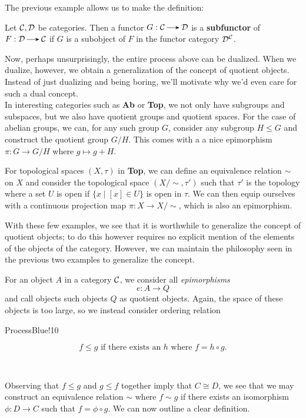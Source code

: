 The previous example allows us to make the definition:
\begin{definition}
    Let $\mathcal{C}, \mathcal{D}$ be categories. Then a functor $G: \cc \to \dd$  
    is a \textbf{subfunctor} of $F: \dd \to \cc$ if $G$ is a subobject of $F$ 
    in the functor category $\mathcal{D}^{\mathcal{C}}$.
\end{definition}

Now, perhaps unsurprisingly, the entire process above can be dualized. When we dualize, 
however, we obtain a generalization of the concept of quotient objects. Instead of just dualizing and 
being boring, we'll motivate why we'd even care for such a dual concept. 
\\

In interesting categories such as \textbf{Ab} or \textbf{Top}, we not only have 
subgroups and subspaces, but we also have quotient groups and quotient spaces. 
For the case of abelian groups, we can, for any such group $G$, consider any 
subgroup $H \le G$ and construct the quotient group $G/H$. This comes with a 
a nice epimorphism $\pi: G \to G/H$ where $g \mapsto g + H$. 

For topological spaces $(X, \tau)$ in \textbf{Top}, we can define an equivalence 
relation $\sim$ on $X$ and consider the topological space $(X/\sim, \tau')$ 
such that $\tau'$ is the topology where a set $U$ is open if $\{x \mid [x] \in U\}$
is open in $\tau$. We can then equip ourselves with a continuous projection map 
$\pi: X \to X/\sim$, which is also an epimorphism. 

With these few examples, we see that it is worthwhile to generalize the concept 
of quotient objects; to do this however requires no explicit mention of the elements of 
the objects of the category. However, we can maintain the philosophy seen in the previous 
two examples to generalize the concept.

For an object $A$ in a category $\mathcal{C}$, we consider all \emph{epimorphisms}
\[
    e: A \to Q
\]
and call objects such objects $Q$ as quotient objects. Again, the space of these 
objects is too large, so we instead consider ordering relation 

\begin{statement}{ProcessBlue!10}
\begin{minipage}{0.6\textwidth}
    \[
        f \le g \text{ if there exists an } h \text{ where } f = h \circ g.
    \]
\end{minipage} 
\begin{minipage}{0.4\textwidth}
\end{minipage}
\end{statement}
Observing that $f \le g$ and $g \le f$ together imply that $C \cong D$, we see that 
we may construct an equivalence relation $\sim$ where $f \sim g $ if there exists an isomorphism 
$\phi: D \to C$ such that $f = \phi \circ g$. We can now outline a clear definition.

